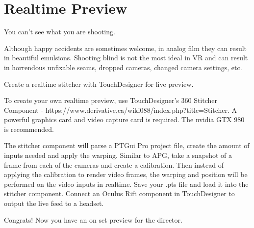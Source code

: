 \chapter{Realtime Preview}
\pagecolor{white}
\label{chap:11}
\begin{fullwidth}

\problem

{\large You can’t see what you are shooting.  \par}


Although happy accidents are sometimes welcome, in analog film they can result in beautiful emulsions.  Shooting blind is not the most ideal in VR and can result in horrendous unfixable seams, dropped cameras, changed camera settings, etc. 


\solution

{\large Create a realtime stitcher with TouchDesigner for live preview. 
 \par}

To create your own realtime preview, use TouchDesigner’s 360 Stitcher Component - https://www.derivative.ca/wiki088/index.php?title=Stitcher. A powerful graphics card and video capture card is required. The nvidia GTX 980 is recommended. 

The stitcher component will parse a PTGui Pro project file, create the amount of inputs needed and apply the warping. Similar to APG, take a snapshot of a frame from each of the cameras and create a calibration. Then instead of applying the calibration to render video frames, the warping and position will be performed on the video inputs in realtime. Save your .pts file and load it into the stitcher component. Connect an Oculus Rift component in TouchDesigner to output the live feed to a headset.

Congrats! Now you have an on set preview for the director.



\clearpage
\end{fullwidth}
